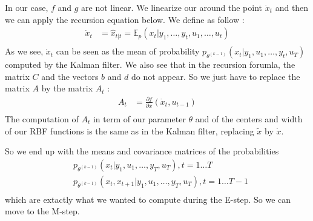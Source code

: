 In our case, $f$ and $g$ are not linear.
We linearize our around the point $\dot{x}_t$ and then we can apply the recursion equation below.
We define  as follow :
\begin{align*}
  \dot{x}_t &= \hat{x}_{t|t} = \mathbb{E}_p(x_t|y_1, \ldots , y_t, u_1, \ldots , u_t) \\
\end{align*}
As we see, $\dot{x}_t$ can be seen as the mean of probability  $p_{\theta^{(k-1)}}\left(x_t|y_1, u_1, \ldots, y_t, u_T \right )$ computed by the Kalman filter.
We also see that in the recursion forumla, the matrix $C$ and the vectors $b$ and $d$ do not appear.
So we just have to replace the matrix $A$ by the matrix $A_t$ :
\begin{align*}
  A_t &= \frac{\partial f}{\partial x}(\dot{x}_t, u_{t-1})\\
\end{align*}
The computation of $A_t$ in term of our parameter $\theta$ and of the centers and width of our RBF functions is the same as in the Kalman filter, replacing $\tilde{x}$ by $\dot{x}$.

So we end up with the means and covariance matrices of the probabilities
\begin{align*}
  &p_{\theta^{(k-1)}}\left(x_t|y_1, u_1, \ldots, y_T, u_T \right ), t=1 \ldots T\\
  &p_{\theta^{(k-1)}}\left(x_t, x_{t+1}|y_1, u_1, \ldots, y_T, u_T \right ), t=1 \ldots T-1\\
\end{align*}
which are extactly what we wanted to compute during the E-step.
So we can move to the M-step.
